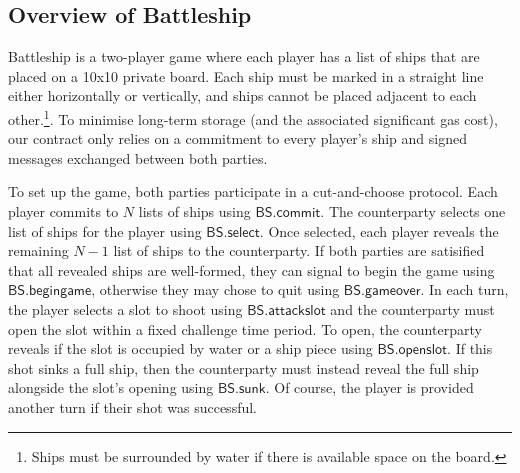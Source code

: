 \documentclass{llncs}
\newcommand{\battleshipfraud}{\mathsf{BS.fraud}}
\newcommand{\battleshipattackslot}{\mathsf{BS.attackslot}}
\newcommand{\battleshipbegin}{\mathsf{BS.begingame}}
\newcommand{\battleshipcommit}{\mathsf{BS.commit}}
\newcommand{\battleshipselectboard}{\mathsf{BS.select}}
\newcommand{\battleshiprevealslot}{\mathsf{BS.openslot}}
\newcommand{\battleshipsinking}{\mathsf{BS.sunk}}
\newcommand{\battleshipgameover}{\mathsf{BS.gameover}}
\begin{document}
\subsection{Overview of Battleship}

Battleship is a two-player game where each player has a list of ships that are placed on a 10x10 private board. 
Each ship must be marked in a straight line either horizontally or vertically, and ships cannot be placed adjacent to each other.\footnote{Ships must be surrounded by water if there is available space on the board.}.
To minimise long-term storage (and the associated significant gas cost), our contract only relies on a commitment to every player's ship and signed messages exchanged between both parties. 

To set up the game, both parties participate in a cut-and-choose protocol.
Each player commits to $N$ lists of ships using $\battleshipcommit$. 
The counterparty selects one list of ships for the player using $\battleshipselectboard$.
Once selected, each player reveals the remaining $N-1$ list of ships to the counterparty. 
If both parties are satisified that all revealed ships are well-formed, they can signal to begin the game using $\battleshipbegin$, otherwise they may chose to quit using $\battleshipgameover$. 
In each turn, the player selects a slot to shoot using $\battleshipattackslot$ and the counterparty must open the slot  within a fixed challenge time period. 
To open, the counterparty reveals if the slot is occupied by water or a ship piece using $\battleshiprevealslot$.
If this shot sinks a full ship, then the counterparty must instead reveal the full ship alongside the slot's opening using $\battleshipsinking$. 
Of course, the player is provided another turn if their shot was successful.
\end{document}
